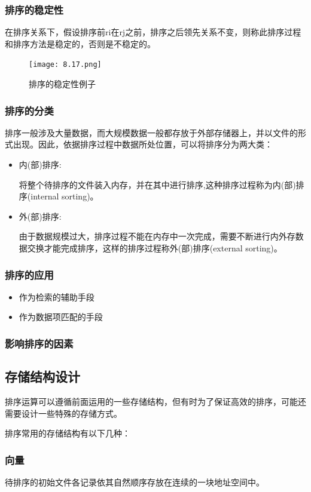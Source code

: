 \documentclass[AutoFakeBold]{LZUThesis2007}
\begin{document}
			\subsubsection{排序的稳定性}
      在排序关系下，假设排序前ri在rj之前，排序之后领先关系不变，则称此排序过程和排序方法是稳定的，否则是不稳定的。
\begin{figure}[H]
    \centering
    \texttt{[image: 8.17.png]}
    \caption{排序的稳定性例子}
    \label{fig_install_texlive}
\end{figure}
			\subsubsection{排序的分类}
排序一般涉及大量数据，而大规模数据一般都存放于外部存储器上，并以文件的形式出现。因此，依据排序过程中数据所处位置，可以将排序分为两大类：
\begin{itemize}
	\item 内(部)排序:

将整个待排序的文件装入内存，并在其中进行排序,这种排序过程称为内(部)排序(internal sorting)。
	\item 外(部)排序:

由于数据规模过大，排序过程不能在内存中一次完成，需要不断进行内外存数据交换才能完成排序，这样的排序过程称外(部)排序(external sorting)。

\end{itemize}

			\subsubsection{排序的应用}
\begin{itemize}
	\item 作为检索的辅助手段
	\item 作为数据项匹配的手段
\end{itemize}
			\subsubsection{影响排序的因素}
		\subsection{存储结构设计}
排序运算可以遵循前面运用的一些存储结构，但有时为了保证高效的排序，可能还需要设计一些特殊的存储方式。

排序常用的存储结构有以下几种：

			\subsubsection{向量}
待排序的初始文件各记录依其自然顺序存放在连续的一块地址空间中。
\end{document}
